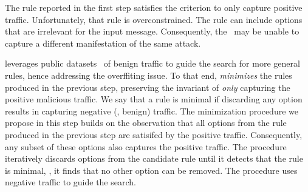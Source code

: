 \documentclass[sigconf,review, anonymous]{acmart}
\begin{document}
The rule reported in the first step satisfies the criterion to only
capture positive traffic. Unfortunately, that rule is overconstrained.
The rule can include options that are irrelevant for the input
message. Consequently, the \nids\ may be unable to capture a different
manifestation of the same attack.


\tname{} leverages public datasets~\cite{tcpreplay} of benign traffic
to guide the search for more general rules, hence addressing the
overffiting issue. To that end, \tname{} \emph{minimizes} the rules
produced in the previous step, preserving the invariant of \emph{only}
capturing the positive malicious traffic. We say that a rule is
minimal if discarding any option results in capturing negative (\ie{},
benign) traffic.  The minimization procedure we propose in this step
builds on the observation that all options from the rule produced in
the previous step are satisifed by the positive traffic. Consequently,
any subset of these options also captures the positive traffic. The
procedure iteratively discards options from the candidate rule until
it detects that the rule is minimal, \ie{}, it finds that no other
option can be removed. The procedure uses negative traffic to guide
the search.
\end{document}
